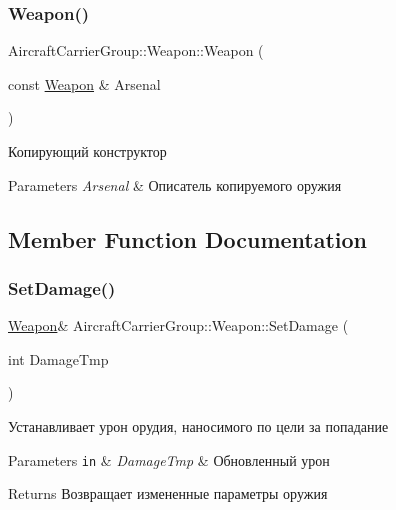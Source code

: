 \subsubsection{\texorpdfstring{Weapon()}{Weapon()}\hspace{0.1cm}{\footnotesize\ttfamily [2/2]}}
{\footnotesize\ttfamily Aircraft\+Carrier\+Group\+::\+Weapon\+::\+Weapon (\begin{DoxyParamCaption}\item[{const \mbox{\hyperlink{class_aircraft_carrier_group_1_1_weapon}{Weapon}} \&}]{Arsenal }\end{DoxyParamCaption})}



Копирующий конструктор 


\begin{DoxyParams}{Parameters}
{\em Arsenal} & Описатель копируемого оружия \\
\hline
\end{DoxyParams}


\subsection{Member Function Documentation}
\mbox{\label{class_aircraft_carrier_group_1_1_weapon_a5d8ce784fb56b4f84f028d92dcae7a25}} 
\subsubsection{\texorpdfstring{Set\+Damage()}{SetDamage()}}
{\footnotesize\ttfamily \mbox{\hyperlink{class_aircraft_carrier_group_1_1_weapon}{Weapon}}\& Aircraft\+Carrier\+Group\+::\+Weapon\+::\+Set\+Damage (\begin{DoxyParamCaption}\item[{int}]{Damage\+Tmp }\end{DoxyParamCaption})\hspace{0.3cm}{\ttfamily [inline]}}



Устанавливает урон орудия, наносимого по цели за попадание 


\begin{DoxyParams}[1]{Parameters}
\mbox{\tt in}  & {\em Damage\+Tmp} & Обновленный урон \\
\hline
\end{DoxyParams}
\begin{DoxyReturn}{Returns}
Возвращает измененные параметры оружия 
\end{DoxyReturn}
\mbox{\label{class_aircraft_carrier_group_1_1_weapon_af026b090b1f5230fdaf68ffcc481eba3}} 
